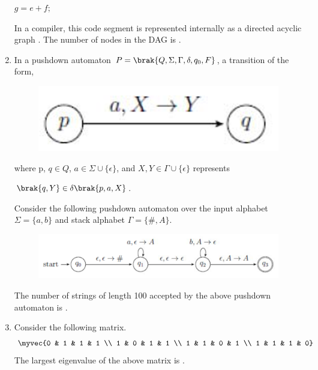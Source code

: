 \documentclass[a4paper, 11pt]{article}
\begin{document}
\begin{enumerate}
    $g = e + f;$
    
    In a compiler, this code segment is represented internally as a directed acyclic graph . The number of nodes in the DAG is \underline{\hspace{2cm}}.
    
    \hfill{}
    
    \item In a pushdown automaton $P=\brak{Q, \Sigma, \Gamma, \delta, q_0, F}$, a transition of the form,\\ 
    \begin{figure}[H]
        \centering
        \includegraphics[width=0.3\columnwidth]{figs/q61A.png}
        \label{fig:placeholder}
    \end{figure}
    where p, $q \in Q$, $a \in \Sigma \cup \{\epsilon\}$, and $X, Y \in \Gamma \cup \{\epsilon\}$ represents \\
    \begin{center}
        $\brak{q,Y} \in \delta\brak{p,a,X}$.
    \end{center}
    Consider the following pushdown automaton over the input alphabet $\Sigma = \{a,b\}$ and stack alphabet $\Gamma = \{\#,A\}$.
    \begin{figure}[H]
        \centering
        \includegraphics[width=0.5\linewidth]{figs/q61B.png}
        \label{fig:placeholder}
    \end{figure}
    The number of strings of length 100 accepted by the above pushdown automaton is \underline{\hspace{2cm}}.
    
    \hfill{}
    
    \item Consider the following matrix.
    \[ \myvec{0 & 1 & 1 & 1 \\ 1 & 0 & 1 & 1 \\ 1 & 1 & 0 & 1 \\ 1 & 1 & 1 & 0} \]
    The largest eigenvalue of the above matrix is \underline{\hspace{2cm}}.
    
    \hfill{}
    

\end{enumerate}
\end{document}

